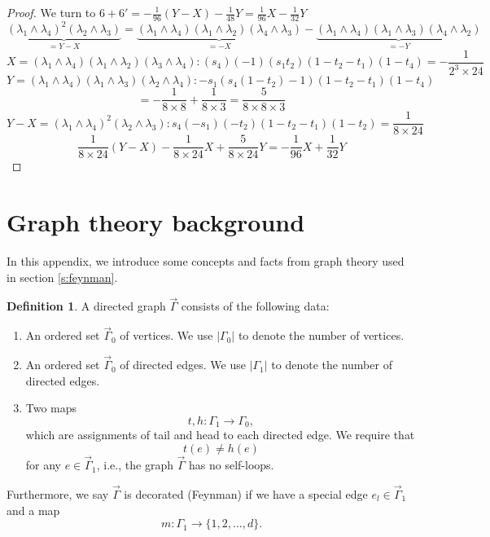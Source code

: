 \documentclass[11pt]{amsart}
\theoremstyle{definition}
\newtheorem{defn}[thm]{Definition}
\theoremstyle{remark}
\numberwithin{equation}{section}
\begin{document}
\begin{proof}
We turn to $\boxed{6}+\boxed{6'}=-\frac{1}{96}(Y-X)-\frac{1}{48}Y=\frac{1}{96}X-\frac{1}{32}Y$
$$
\underbrace{\left(\lambda_1 \wedge \lambda_4\right)^2\left(\lambda_2 \wedge \lambda_3\right)}_{=Y-X}=\underbrace{\left(\lambda_1 \wedge \lambda_4\right)\left(\lambda_1 \wedge \lambda_2\right)\left(\lambda_4 \wedge \lambda_3\right)}_{=-X}-\underbrace{\left(\lambda_1 \wedge \lambda_4\right)\left(\lambda_1 \wedge \lambda_3\right)\left(\lambda_4 \wedge \lambda_2\right)}_{=-Y}
$$
$$
X=\left(\lambda_1 \wedge \lambda_4\right)\left(\lambda_1 \wedge \lambda_2\right)\left(\lambda_3 \wedge \lambda_4\right):(s_4)(-1)(s_1t_2)(1-t_2-t_1)(1-t_4)=-\frac{1}{2^3\times 24}
$$
$$
Y=\left(\lambda_1 \wedge \lambda_4\right)\left(\lambda_1 \wedge \lambda_3\right)\left(\lambda_2 \wedge \lambda_4\right):-s_1(s_4(1-t_2)-1)(1-t_2-t_1)(1-t_4)
$$
$$
=-\frac{1}{8\times 8}+\frac{1}{8\times 3}=\frac{5}{8\times 8\times 3}
$$
$$
Y-X=\left(\lambda_1 \wedge \lambda_4\right)^2\left(\lambda_2 \wedge \lambda_3\right):s_4(-s_1)(-t_2)(1-t_2-t_1)(1-t_2)=\frac{1}{8\times 24}
$$
$$
\frac{1}{8\times 24}(Y-X)-\frac{1}{8\times 24}X+\frac{5}{8\times 24}Y=-\frac{1}{96}X+\frac{1}{32}Y
$$

\end{proof}
\fi

\appendix 

\section{Graph theory background}\label{graph theory}

In this appendix, we introduce some concepts and facts from graph theory used in section \ref{s:feynman}. 
\begin{defn}
    A directed graph $\vec{\Gamma}$ consists of the following data:
    \begin{enumerate}
        \item An ordered set $\vec{\Gamma}_{0}$ of vertices. We use $|\Gamma_{0}|$ to denote the number of vertices.
        \item An ordered set $\vec{\Gamma}_{0}$ of directed edges. We use $|\Gamma_{1}|$ to denote the number of directed edges.
        \item Two maps
        $$
        t,h:\Gamma_{1}\rightarrow\Gamma_{0},
        $$
        which are assignments of tail and head to each directed edge. We require that 
        $$
        t(e)\neq h(e)
        $$
        for any $e\in\vec{\Gamma}_{1}$, i.e., the graph $\vec{\Gamma}$ has no self-loops.
    \end{enumerate}
    Furthermore, we say $\vec{\Gamma}$ is decorated (Feynman) if we have a special edge $e_{l}\in \vec{\Gamma}_{1}$ and a map 
    $$
    m:\Gamma_{1}\rightarrow\{1,2,\dots,d\}.
    $$
\end{defn}
\end{document}
